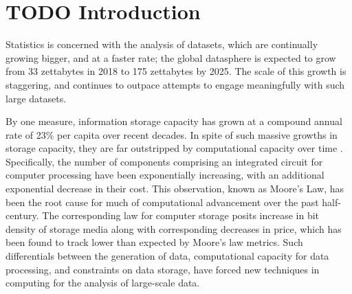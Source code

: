 \documentclass[a4paper,10pt]{article}
\begin{document}

\tableofcontents
\newpage
\section{TODO Introduction}

Statistics is concerned with the analysis of datasets, which are continually growing bigger, and at a faster rate;
the global datasphere is expected to grow from 33 zettabytes in 2018 to 175 zettabytes by 2025\cite{rydning2018digitization}.
The scale of this growth is staggering, and continues to outpace attempts to engage meaningfully with such large datasets. 

By one measure, information storage capacity has grown at a compound annual rate of 23\% per capita over recent decades\cite{hilbert2011world}.
In spite of such massive growths in storage capacity, they are far outstripped by computational capacity over time \cite{fontana2018moore}.
Specifically, the number of components comprising an integrated circuit for computer processing have been exponentially increasing, with an additional exponential decrease in their cost\cite{moore1975progress}.
This observation, known as Moore's Law, has been the root cause for much of computational advancement over the past half-century.
The corresponding law for computer storage posits increase in bit density of storage media along with corresponding decreases in price, which has been found to track lower than expected by Moore's law metrics.
Such differentials between the generation of data, computational capacity for data processing, and constraints on data storage, have forced new techniques in computing for the analysis of large-scale data.\\
\end{document}
